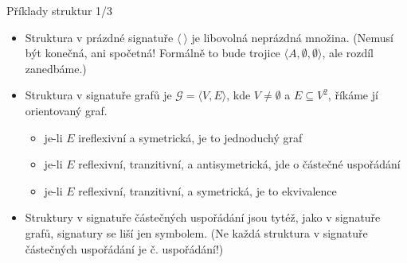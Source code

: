 \documentclass{beamer}
\begin{document}
\begin{frame}{Příklady struktur 1/3}
    
    \begin{itemize}
        \item Struktura \alert{v prázdné signatuře} $\langle\ \rangle$ je libovolná neprázdná množina. \pause (Nemusí být konečná, ani spočetná! Formálně to bude trojice $\langle A,\emptyset,\emptyset\rangle$, ale rozdíl zanedbáme.) \pause             

        \item Struktura \alert{v signatuře grafů} je $\mathcal G=\langle V,E\rangle$, kde $V\neq\emptyset$ a $E\subseteq V^2$, říkáme jí \alert{orientovaný graf}. \pause  
        \begin{itemize}
            \item je-li $E$ ireflexivní a symetrická, je to \alert{jednoduchý} graf \pause 
            \item je-li $E$ reflexivní, tranzitivní, a antisymetrická, jde o \alert{částečné uspořádání} \pause 
            \item je-li $E$ reflexivní, tranzitivní, a symetrická, je to \alert{ekvivalence} \pause 
        \end{itemize}
        \item Struktury \alert{v signatuře částečných uspořádání} jsou tytéž, jako v signatuře grafů, signatury se liší jen symbolem. \pause (Ne každá struktura v signatuře částečných uspořádání je č. uspořádání!)
    \end{itemize}

\end{frame}
\end{document}
